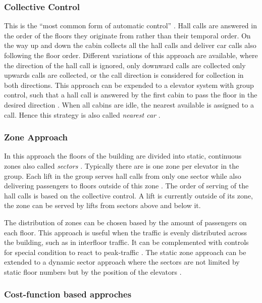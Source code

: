 \subsubsection{Collective Control}
This is the \enquote{most common form of automatic control} \autocite[][p.~237]{barney2016handbook}.
Hall calls are answered in the order of the floors they originate from rather than their temporal order.
On the way up and down the cabin collects all the hall calls and deliver car calls also following the floor order.
Different variations of this approach are available, where the direction of the hall call is ignored, only downward calls are collected only upwards calls are collected, or the call direction is considered for collection in both directions.
This approach can be expended to a elevator system with group control, such that a hall call is answered by the first cabin to pass the floor in the desired direction \autocite[][p.~238]{barney2016handbook}.
When all cabins are idle, the nearest available is assigned to a call. Hence this strategy is also called \emph{nearest car}
\autocite[][p.~244]{barney2016handbook}.

\subsubsection{Zone Approach}
In this approach the floors of the building are divided into static, continuous zones also called \emph{sectors} \autocite[][p.~247]{barney2016handbook}. 
Typically there are is one zone per elevator in the group. 
Each lift in the group serves hall calls from only one sector
while also delivering passengers to floors outside of this zone
\autocite[][pp.~3--6]{axelsson2013strategies}.
The order of serving of the hall calls is based on the collective control.
A lift is currently outside of its zone, 
the zone can be served by lifts from sectors above and below it.

The distribution of zones can be chosen based by the amount of passengers on each floor.
This approach is useful when the traffic is evenly distributed across the building, such as in interfloor traffic. It can be complemented with controls for special condition to react to peak-traffic \autocite[][p.~247]{barney2016handbook}.
The static zone approach can be extended to a dynamic sector approach where the sectors are not limited by static floor numbers but by the position of the elevators \autocite[][p.~250]{barney2016handbook}.

\subsubsection{Cost-function based approches}

